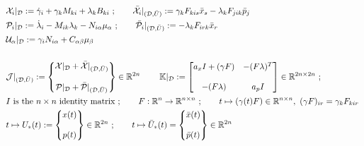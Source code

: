\documentclass[11pt]{article}
\newcommand{\R}{\mathbb R}
\newcommand{\K}{\mathbb{K}}
\newcommand{\calP}{{\cal P}}
\newcommand{\calU}{{\cal U}}
\newcommand{\calX}{{\cal X}}
\newcommand{\dee}{\mathcal{D}}
\begin{document}
\begin{subequations}
    \allowdisplaybreaks
    \begin{align}
        & \calX_i|_\dee := \dot{\gamma}_i + \gamma_k M_{ki} + \lambda_k B_{ki} \ ; \qquad \bar{\calX}_i|_{(\dee,\bar{U})} := \gamma_k F_{kis} \bar{x}_s - \lambda_k F_{jik}\bar{p}_j \notag \\
        & \calP_i |_\dee := \dot{\lambda}_i - M_{ik} \lambda_k - N_{i \alpha} \mu_\alpha \ ; \qquad \bar{\calP}_i |_{(\dee,\bar{U})} := - \lambda_k F_{irk} \bar{x}_r \notag\\
        & \calU_\alpha |_\dee := \gamma_i N_{i \alpha} + C_{\alpha \beta} \mu_\beta  \notag \\
        \notag \\
        & \mathcal{J}|_{(\dee, \bar{U})} : = \begin{Bmatrix} \calX|_\dee + \bar{\calX}|_{(\dee, \bar{U})} \\ \\ \calP|_\dee + \bar{\calP}|_{(\dee, \bar{U})} \end{Bmatrix} \in \R^{2n}\; \qquad \K|_\dee := \begin{bmatrix} a_x I + (\gamma F) & -(F\lambda)^T   \\
                                                                  &   \\
                                                                  -(F \lambda) & a_p I \end{bmatrix} \in \R^{2n \times 2n} \ ; \notag\\
                                                                  &  I \mbox{ is the } n \times n \mbox{ identity matrix} \ ; \qquad F: \R^n \to \R^{n \times n} \ ; \qquad t \mapsto (\gamma(t) F) \in \R^{n \times n}, \ (\gamma F)_{ir} =\gamma_k F_{kir} \ \notag\\
        & t \mapsto U_*(t) := \begin{Bmatrix} x(t)  \\
                                    \\
                                  p(t)
                   \end{Bmatrix} \in \R^{2n} \ ; \qquad t \mapsto \bar{U}_*(t) = \begin{Bmatrix} \bar{x}(t) \\
                                                                \\
                                                             \bar{p}(t)
                                                        \end{Bmatrix} \in \R^{2n} \notag
    \end{align}
\end{subequations}
\end{document}

